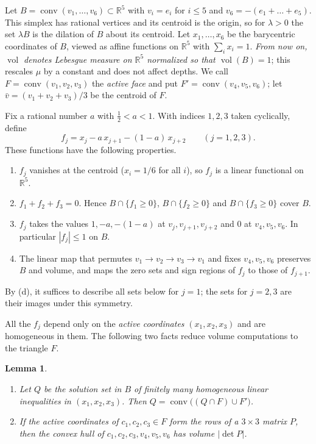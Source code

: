 \documentclass[11pt]{article}
\newtheorem{lemma}[theorem]{Lemma}
\newcommand{\R}{\mathbb{R}}
\newcommand{\1}{\mathbf{1}}
\DeclareMathOperator{\conv}{conv}
\DeclareMathOperator{\vol}{vol}
\begin{document}
Let $B=\conv(v_1,\ldots,v_6)\subset\R^5$ with $v_i=e_i$ for $i\le5$ and $v_6=-(e_1+\dots+e_5)$. This simplex has rational
vertices and its centroid is the origin, so for $\lambda>0$ the set $\lambda B$ is the dilation of $B$ about its centroid.
Let $x_1,\ldots,x_6$ be the barycentric coordinates of $B$, viewed as affine functions on $\R^5$ with $\sum_ix_i=1$.
\emph{From now on, $\vol$ denotes Lebesgue measure on $\R^5$ normalized so that $\vol(B)=1$}; this rescales $\mu$ by a
constant and does not affect depths. We call $F=\conv(v_1,v_2,v_3)$ the \emph{active face} and put $F'=\conv(v_4,v_5,v_6)$;
let $\bar v=(v_1+v_2+v_3)/3$ be the centroid of $F$.

Fix a rational number $a$ with $\frac12<a<1$. With indices $1,2,3$ taken cyclically, define
\[
f_j=x_j-a\,x_{j+1}-(1-a)\,x_{j+2}\qquad(j=1,2,3).
\]
These functions have the following properties.
\begin{enumerate}[label=(\alph*)]
\item $f_j$ vanishes at the centroid ($x_i=1/6$ for all $i$), so $f_j$ is a linear functional on $\R^5$.
\item $f_1+f_2+f_3=0$. Hence $B\cap\{f_1\ge0\}$, $B\cap\{f_2\ge0\}$ and $B\cap\{f_3\ge0\}$ cover $B$.
\item $f_j$ takes the values $1,-a,-(1-a)$ at $v_j,v_{j+1},v_{j+2}$ and $0$ at $v_4,v_5,v_6$. In particular $|f_j|\le1$ on
$B$.
\item The linear map that permutes $v_1\to v_2\to v_3\to v_1$ and fixes $v_4,v_5,v_6$ preserves $B$ and volume, and maps the
zero sets and sign regions of $f_j$ to those of $f_{j+1}$.
\end{enumerate}
By (d), it suffices to describe all sets below for $j=1$; the sets for $j=2,3$ are their images under this symmetry.

All the $f_j$ depend only on the \emph{active coordinates} $(x_1,x_2,x_3)$ and are homogeneous in them. The following two
facts reduce volume computations to the triangle $F$.

\begin{lemma}\label{lem:join}
\begin{enumerate}[label=(\alph*)]
\item Let $Q$ be the solution set in $B$ of finitely many homogeneous linear inequalities in $(x_1,x_2,x_3)$. Then
$Q=\conv\bigl((Q\cap F)\cup F'\bigr)$.
\item If the active coordinates of $c_1,c_2,c_3\in F$ form the rows of a $3\times3$ matrix $P$, then the convex hull of
$c_1,c_2,c_3,v_4,v_5,v_6$ has volume $|\det P|$.
\end{enumerate}
\end{lemma}
\end{document}
